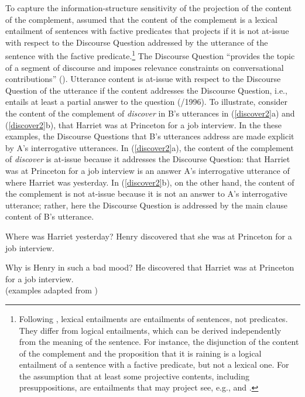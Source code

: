 \documentclass[11pt,fleqn]{article}
\newcommand{\6}{\mbox{$[\hspace*{-.6mm}[$}}
\newcommand{\9}{\mbox{$]\hspace*{-.6mm}]$}}
\begin{document}
To capture the information-structure sensitivity of the projection of the content of the complement,  \citealt{brst-salt10,best-question} assumed that the content of the complement is a lexical entailment of sentences with factive predicates that projects if it is not at-issue with respect to the Discourse Question addressed by the utterance of the sentence with the factive predicate.\footnote{Following \citealt{abrusan2011}, lexical entailments are entailments of sentences, not predicates. They differ from logical entailments, which can be derived independently from the meaning of the sentence. For instance, the disjunction of the content of the complement and the proposition that it is raining is a logical entailment of a sentence with a factive predicate, but not a lexical one. For the assumption that at least some projective contents, including presuppositions, are entailments that may project see, e.g., \citealt{gazdar79b,barker02,schlenker10,abrusan2011,abrusan2016} and \citealt{anand-hacquard2014}.} The Discourse Question ``provides the topic of a segment of discourse and imposes relevance constraints on conversational contributions'' (\citealt[192]{best-question}). Utterance content is at-issue with respect to the Discourse Question of the utterance if the content addresses the Discourse Question, i.e., entails at least a partial answer to the question (\citealt{roberts12}/1996). To illustrate, consider the content of the complement of {\em discover} in B's utterances in (\ref{discover2}a) and (\ref{discover2}b), that Harriet was at Princeton for a job interview. In the these examples, the Discourse Questions that B's utterances address are made explicit by A's interrogative utterances. In (\ref{discover2}a), the content of the  complement of {\em discover} is at-issue because it addresses the Discourse Question: that Harriet was at Princeton for a job interview is an answer A's interrogative utterance of where Harriet was yesterday. In (\ref{discover2}b), on the other hand, the content of the complement is not at-issue because it is not an answer to A's interrogative utterance; rather, here the Discourse Question is addressed by the main clause content of B's utterance.


\begin{exe}
\ex\label{discover2}
\begin{xlist}
\ex
\begin{xlist}
 Where was Harriet yesterday?
 Henry discovered that she was at Princeton for a job interview.
\end{xlist}

\ex
\begin{xlist}
 Why is Henry in such a bad mood?
 He discovered that Harriet was at Princeton for a job interview.
\\ \hspace*{.2cm} \hfill (examples adapted from \citealt[1035]{simons07})
\end{xlist}

\end{xlist}
\end{exe}
\end{document}

